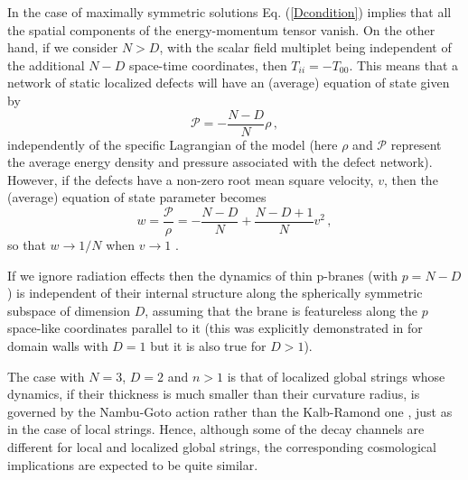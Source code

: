 \documentclass[prd,twocolumn,a4paper,superscriptaddress,floatfix]{revtex4}
\def\be{\begin{equation}}
\def\ee{\end{equation}}
\begin{document}
In the case of maximally symmetric solutions Eq. (\ref{Dcondition}) implies that all the spatial components of the energy-momentum tensor vanish. On the other hand, if we consider $N>D$, with the scalar field multiplet being independent of the additional $N-D$ space-time coordinates, then $T_{ii}=-T_{00}$. This means that a network of static localized defects will have an (average) equation of state given by
\be\label{funcionalEqSt}
{\mathcal P}=-\frac{N-D}{N}\rho\,,
\ee
independently of the specific Lagrangian of the model (here $\rho$ and $\mathcal P$ represent the average energy density and pressure associated with the defect network). However, if the defects have a non-zero root mean square
velocity, $v$, then the (average) equation of state parameter becomes
\be\label{funcionalEqSt1}
w=\frac{\mathcal P}{\rho}=-\frac{N-D}{N}+\frac{N-D+1}{N}v^2\,,
\ee
so that $w \to 1/N$ when $v \to 1$ \cite{Avelino:2008mv}. 

If we ignore radiation effects then the dynamics of thin p-branes (with $p=N-D$) is independent of their internal structure along the spherically symmetric subspace of dimension $D$, assuming that the brane is featureless along the $p$ space-like coordinates parallel to it (this was explicitly demonstrated in \cite{Avelino:2008ve,2010PhRvD..81h7305S} for domain walls with $D=1$ but it is also true for $D>1$). 

The case with $N=3$, $D=2$ and $n>1$ is that of localized global strings whose dynamics, if their thickness is much smaller than their curvature radius, is governed by the Nambu-Goto action \cite{1971PThPh..46.1560G} rather than the Kalb-Ramond one \cite{1974PhRvD...9.2273K}, just as in the case of local strings. Hence, although some of the decay channels are different for local and localized global strings, the corresponding cosmological implications are expected to be quite similar. 
\end{document}
